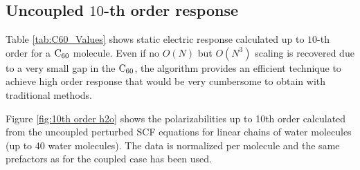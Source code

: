 \documentclass[prl,aps,letterpaper,twocolumn,showpacs,twocolumngrid,superbib]{revtex4}
\begin{document}
\subsection{Uncoupled $10$-th order response}




Table \ref{tab:C60_Values} shows static electric response
calculated up to $10$-th order for a $\rm C_{60}$ molecule.
Even if no $O(N)$ but $O(N^3)$ scaling is recovered due to a very small gap in the $\rm C_{60}$,
the algorithm provides an efficient technique to achieve high order response that
would be very cumbersome to obtain with traditional methods.


Figure \ref{fig:10th order h2o} shows the polarizabilities up to 10th
order calculated from the uncoupled perturbed SCF equations for linear
chains of water molecules (up to 40 water molecules). The data is normalized per molecule and the
same prefactors as for the coupled case has been used.
\end{document}
